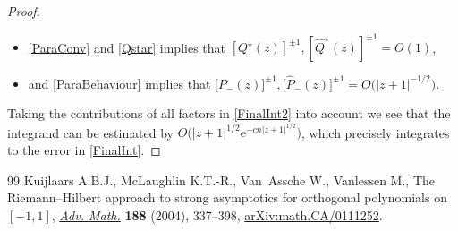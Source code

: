 \documentclass[10pt,a4paper]{amsart}
\newcommand{\sbQ}{Q^\star}
\newcommand{\shQ}{{\widehat Q^\star}}
\newcommand{\bP}{P}
\newcommand{\hP}{{\widehat P}}
\newcommand{\E}{\mathrm{e}}
\numberwithin{equation}{section}
\begin{document}
\begin{proof}
\begin{itemize}
\begin{align*}
\begin{cases}
 \quad= O\big(|s+1|^{3/2}\E^{-cn|s+1|^{1/2}}\big),\qquad s \in \Sigma^U \setminus (-1,1),
 \\
  0, \qquad s \in \Sigma^U \cap (-1,1),
 \end{cases}
 \end{align*}
 \item \eqref{ParaConv} and \eqref{Qstar} implies that $[\sbQ(z)]^{\pm 1}, [\shQ(z)]^{\pm 1} = O(1)$,
 \item and \eqref{ParaBehaviour} implies that $\big[\bP_-(z)\big]^{\pm 1}, \big[\hP_-(z)\big]^{\pm 1} = O\big(|z+1|^{-1/2}\big)$.
\end{itemize}
Taking the contributions of all factors in \eqref{FinalInt2} into account we see that the integrand can be estimated by $O\big(|z+1|^{1/2}\E^{-cn|z+1|^{1/2}}\big)$, which precisely integrates to the error in \eqref{FinalInt}.
\end{proof}

\begin{thebibliography}{99}
Kuijlaars A.B.J., McLaughlin K.T.-R., Van~Assche W., Vanlessen M., The
 {R}iemann--{H}ilbert approach to strong asymptotics for orthogonal
 polynomials on {$[-1,1]$}, \href{https://doi.org/10.1016/j.aim.2003.08.015}{\textit{Adv. Math.}} \textbf{188} (2004), 337--398,
 \href{https://arxiv.org/abs/math.CA/0111252}{arXiv:math.CA/0111252}.
\end{thebibliography}
\end{document}

